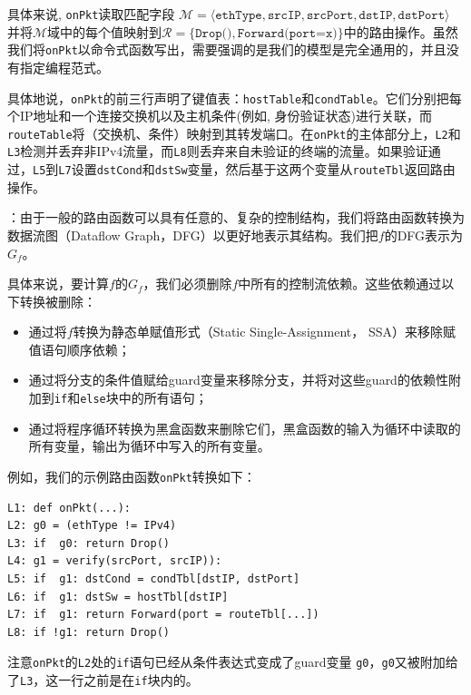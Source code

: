 具体来说, \texttt{onPkt}读取匹配字段
$\mathcal{M} = \langle \texttt{ethType}, \texttt{srcIP}, \texttt{srcPort}, \texttt{dstIP}, \texttt{dstPort} \rangle$ 
并将$\mathcal{M}$域中的每个值映射到$\mathcal{R}=\{\texttt{Drop()}, \texttt{Forward(port=x)} \}$中的路由操作。虽然我们将\texttt{onPkt}以命令式函数写出，需要强调的是我们的模型是完全通用的，并且没有指定编程范式。


具体地说，\texttt{onPkt}的前三行声明了键值表：\texttt{hostTable}和\texttt{condTable}。它们分别把每个IP地址和一个连接交换机以及主机条件(例如, 身份验证状态)进行关联，而\texttt{routeTable}将（交换机、条件）映射到其转发端口。在\texttt{onPkt}的主体部分上，\texttt{L2}和\texttt{L3}检测并丢弃非IPv4流量，而\texttt{L8}则丢弃来自未验证的终端的流量。如果验证通过，\texttt{L5}到\texttt{L7}设置\texttt{dstCond}和\texttt{dstSw}变量，然后基于这两个变量从\texttt{routeTbl}返回路由操作。



：由于一般的路由函数可以具有任意的、复杂的控制结构，我们将路由函数转换为数据流图（Dataflow Graph，DFG）以更好地表示其结构。我们把$f$的DFG表示为$G_f$。

具体来说，要计算$f$的$G_f$，我们必须删除$f$中所有的控制流依赖。这些依赖通过以下转换被删除：

\begin{itemize}
  \item 通过将$f$转换为静态单赋值形式（Static Single-Assignment， SSA）来移除赋值语句顺序依赖；
  \item 通过将分支的条件值赋给guard变量来移除分支，并将对这些guard的依赖性附加到\texttt{if}和\texttt{else}块中的所有语句；
  \item 通过将程序循环转换为黑盒函数来删除它们，黑盒函数的输入为循环中读取的所有变量，输出为循环中写入的所有变量。
\end{itemize}

例如，我们的示例路由函数\texttt{onPkt}转换如下：

\begin{verbatim}
L1: def onPkt(...):
L2: g0 = (ethType != IPv4)
L3: if  g0: return Drop()
L4: g1 = verify(srcPort, srcIP)):
L5: if  g1: dstCond = condTbl[dstIP, dstPort]
L6: if  g1: dstSw = hostTbl[dstIP]
L7: if  g1: return Forward(port = routeTbl[...])
L8: if !g1: return Drop()
\end{verbatim}

注意\texttt{onPkt}的\texttt{L2}处的\texttt{if}语句已经从条件表达式变成了guard变量 \texttt{g0}，\texttt{g0}又被附加给了\texttt{L3}，这一行之前是在\texttt{if}块内的。

